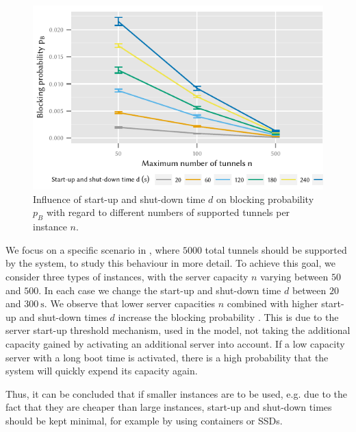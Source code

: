\begin{figure}
  \centering
  \includegraphics{cloud/virtualized_network_functions/performance_evaluation/figures/compare_maxinstances_block}
  \caption{Influence of start-up and shut-down time \(d\) on blocking probability \(p_B\) with regard to different numbers of supported tunnels per instance \(n\).}
  \label{fig:cloud_virtualized_network_functions:startup_shutdown:compare_maxinstances_block}
\end{figure}
 
We focus on a specific scenario in , where \(5000\) total tunnels should be supported by the system, to study this behaviour in more detail.
To achieve this goal, we consider three types of instances, with the server capacity \(n\) varying between \(50\) and \(500\).
In each case we change the start-up and shut-down time \(d\) between \(20\) and \(\SI{300}{\second}\).
We observe that lower server capacities \(n\) combined with higher start-up and shut-down times \(d\) increase the blocking probability \blockingprobability.
This is due to the server start-up threshold mechanism, used in the model, not taking the additional capacity gained by activating an additional server into account.
If a low capacity server with a long boot time is activated, there is a high probability that the system will quickly expend its capacity again.

Thus, it can be concluded that if smaller instances are to be used, e.g. due to the fact that they are cheaper than large instances, start-up and shut-down times should be kept minimal, for example by using containers or \glspl{SSD}.